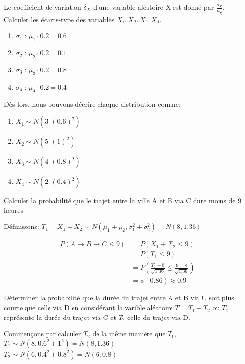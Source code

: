\begin{exo}
\begin{subexo}{Le coefficient de variation $\delta_X$ d'une variable aléatoire X est donné par $\frac{\sigma_X}{\mu_X}$. Calculer les écarts-type des variables $X_1,X_2,X_3,X_4$.}
\begin{center}
			  \begin{enumerate}
				\item $\sigma_1$ : $\mu_1 \cdot 0.2 = 0.6$ 
				\item $\sigma_2$ : $\mu_2 \cdot 0.2 = 0.1$ 
				\item $\sigma_3$ : $\mu_3 \cdot 0.2 = 0.8$ 
				\item $\sigma_4$ : $\mu_4 \cdot 0.2 = 0.4$ 
			\end{enumerate}
		Dès lors, nous pouvons décrire chaque distribution comme:
		  \begin{enumerate}
			\item $X_1 \sim N\left(3, (0.6)^2\right)$
			\item $X_2 \sim N\left(5, (1)^2\right)$
			\item $X_3 \sim N\left(4, (0.8)^2\right)$
			\item $X_4 \sim N\left(2, (0.4)^2\right)$
		\end{enumerate}
		\end{center}
	\end{subexo}	
	\begin{subexo}{Calculer la probabilité que le trajet entre la ville A et B via C dure moins de 9 heures.}
		\begin{center}
			Définissons: $T_1 = X_1 + X_2 \sim N(\mu_1 + \mu_2, \sigma_1^2 + \sigma_2^2) = N(8,1.36)$
		\end{center}
		\begin{align*}
			P(A \rightarrow B \rightarrow C \leq 9) &= P(X_1 + X_2 \leq 9) \\
			&= P(T_1 \leq 9) \\
			&= P\left(\frac{T_1-8}{\sqrt{1.36}} \leq \frac{9-8}{\sqrt{1.36}}\right) \\
			&= \phi(0.86) \approx 0.9
		\end{align*}
	\end{subexo}
	\begin{subexo}{Déterminer la probabilité que la durée du trajet entre A et B via C soit plus courte que celle via D en considérant la varible aléatoire $T = T_1 - T_2$ ou $T_1$ représente la durée du trajet via C et $T_2$ celle du trajet via D.}
	\end{subexo}
	\begin{center}
		Commençons par calculer $T_2$ de la même manière que $T_1$, \\
		$T_1 \sim N\left(8,0.6^2 + 1^2\right) = N(8,1.36)$ \\
		$T_2 \sim N\left(6,0.4^2 + 0.8^2\right) = N(6,0.8)$ \\

\end{center}
\end{exo}
